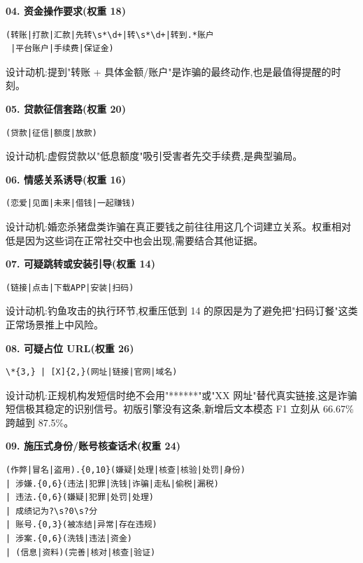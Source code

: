 \documentclass[UTF8,a4paper,12pt]{ctexart}
\begin{document}
\textbf{04. 资金操作要求(权重 18)}

\begin{lstlisting}[language={}]
(转账|打款|汇款|先转\s*\d+|转\s*\d+|转到.*账户
 |平台账户|手续费|保证金)
\end{lstlisting}

设计动机:提到"转账 + 具体金额/账户"是诈骗的最终动作,也是最值得提醒的时刻。

\textbf{05. 贷款征信套路(权重 20)}

\begin{lstlisting}[language={}]
(贷款|征信|额度|放款)
\end{lstlisting}

设计动机:虚假贷款以"低息额度"吸引受害者先交手续费,是典型骗局。

\textbf{06. 情感关系诱导(权重 16)}

\begin{lstlisting}[language={}]
(恋爱|见面|未来|借钱|一起赚钱)
\end{lstlisting}

设计动机:婚恋杀猪盘类诈骗在真正要钱之前往往用这几个词建立关系。权重相对低是因为这些词在正常社交中也会出现,需要结合其他证据。

\textbf{07. 可疑跳转或安装引导(权重 14)}

\begin{lstlisting}[language={}]
(链接|点击|下载APP|安装|扫码)
\end{lstlisting}

设计动机:钓鱼攻击的执行环节,权重压低到 14 的原因是为了避免把"扫码订餐"这类正常场景推上中风险。

\textbf{08. 可疑占位 URL(权重 26)}

\begin{lstlisting}[language={}]
\*{3,} | [X]{2,}(网址|链接|官网|域名)
\end{lstlisting}

设计动机:正规机构发短信时绝不会用"******"或"XX 网址"替代真实链接,这是诈骗短信极其稳定的识别信号。初版引擎没有这条,新增后文本模态 F1 立刻从 66.67\% 跨越到 87.5\%。

\textbf{09. 施压式身份/账号核查话术(权重 24)}

\begin{lstlisting}[language={}]
(作弊|冒名|盗用).{0,10}(嫌疑|处理|核查|核验|处罚|身份)
| 涉嫌.{0,6}(违法|犯罪|洗钱|诈骗|走私|偷税|漏税)
| 违法.{0,6}(嫌疑|犯罪|处罚|处理)
| 成绩记为?\s?0\s?分
| 账号.{0,3}(被冻结|异常|存在违规)
| 涉案.{0,6}(洗钱|违法|资金)
| (信息|资料)(完善|核对|核查|验证)
\end{lstlisting}
\end{document}
